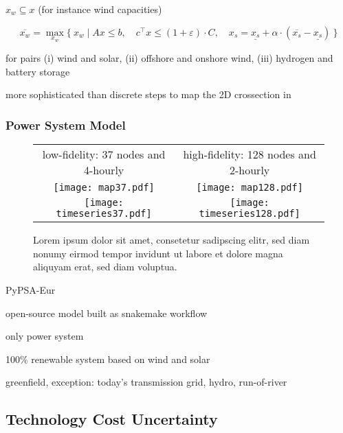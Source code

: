 $x_w\subseteq x$ (for instance wind capacities)

\begin{equation}
    \overline{x_w} = \max_{x_w}\{\:x_w \mid Ax\leq b,\quad c^\top x\leq (1+\varepsilon)\cdot C, \quad x_s = \underline{x_s} + \alpha \cdot (\overline{x_s}-\underline{x_s}) \:\}
\end{equation}

for pairs
(i) wind and solar,
(ii) offshore and onshore wind,
(iii) hydrogen and battery storage

more sophisticated than discrete steps to map the 2D crossection in \cite{pedersen_modeling_2020}


\subsubsection{Power System Model}


\begin{SCfigure}
    \begin{tabular}{cc}
        \footnotesize low-fidelity: 37 nodes and 4-hourly & \footnotesize high-fidelity: 128 nodes and 2-hourly \\
        \texttt{[image: map37.pdf]} &
        \texttt{[image: map128.pdf]} \\
        \texttt{[image: timeseries37.pdf]} &
        \texttt{[image: timeseries128.pdf]} \\
    \end{tabular}
    \caption{Lorem ipsum dolor sit amet, consetetur sadipscing elitr, sed diam nonumy eirmod tempor invidunt ut labore et dolore magna aliquyam erat, sed diam voluptua.}
\end{SCfigure}

PyPSA-Eur \cite{pypsa} \cite{pypsaeur} \cite{hoersch_spatial_2017} 

open-source model built as snakemake workflow \cite{snakemake}

only power system

100\% renewable system based on wind and solar

greenfield, exception: today's transmission grid, hydro, run-of-river


\subsection{Technology Cost Uncertainty}
\label{sec:uncertainty}

